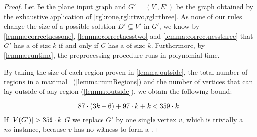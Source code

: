 \begin{proof}
    Let \G be the plane input graph and $G'=(V',E')$ be the graph obtained by the exhaustive application of \cref{rgl:rone,rgl:rtwo,rgl:rthree}.
    As none of our rules change the size of a possible solution $D' \subseteq V'$ in $G'$, we know by \cref{lemma:correctnessone}, \cref{lemma:correctnesstwo} and \cref{lemma:correctnessthree} that $G'$ has a \sdom of size $k$ if and only if $G$ has a \sdom of size $k$.
    Furthermore, by \cref{lemma:runtime}, the preprocessing procedure runs in polynomial time.
    
    By taking the size of each region proven in \cref{lemma:outside}, the total number of regions in a maximal \dreg~(\cref{lemma:numRegions}) and the number of vertices that can lay outside of any region (\cref{lemma:outside}), we obtain the following bound:
    
    \begin{equation}
         87 \cdot (3k - 6) + 97 \cdot k + k < 359 \cdot k
    \end{equation}
    \noindent If $\abs{V(G')} > 359 \cdot k$ $G$ we replace $G'$ by one single vertex $v$, which is trivially a \emph{no}-instance, because $v$ has no witness to form a \sdom.

\end{proof}